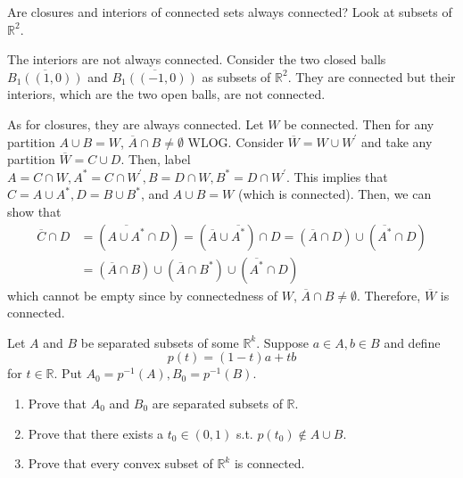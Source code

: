   \begin{exercise}[Rudin 2.20]
    Are closures and interiors of connected sets always connected? Look at subsets of $\mathbb{R}^2$. 
  \end{exercise}
  \begin{solution}
    The interiors are not always connected. Consider the two closed balls $\overline{B_1 ((1, 0))}$ and $\overline{B_1 ((-1, 0))}$ as subsets of $\mathbb{R}^2$. They are connected but their interiors, which are the two open balls, are not connected. 

    As for closures, they are always connected. Let $W$ be connected. Then for any partition $A \cup B = W$, $\overline{A} \cap B \neq \emptyset$ WLOG. Consider $\overline{W} = W \cup W^\prime$ and take any partition $\overline{W} = C \cup D$. Then, label $A = C \cap W, A^\ast = C \cap W^\prime, B = D \cap W, B^\ast = D \cap W^\prime$. This implies that $C = A \cup A^\ast, D = B \cup B^\ast$, and $A \cup B = W$ (which is connected). Then, we can show that 
    \begin{align*}
        \overline{C} \cap D & = (\overline{A \cup A^\ast} \cap D) = (\overline{A} \cup \overline{A^\ast}) \cap D = (\overline{A} \cap D) \cup (\overline{A^\ast} \cap D) \\
        & =(\overline{A} \cap B) \cup (\overline{A} \cap B^\ast) \cup (\overline{A^\ast} \cap D)
    \end{align*}
    which cannot be empty since by connectedness of $W$, $\overline{A} \cap B \neq \emptyset$. Therefore, $\overline{W}$ is connected. 
  \end{solution}

  \begin{exercise}[Rudin 2.21]
    Let $A$ and $B$ be separated subsets of some $\mathbb{R}^k$. Suppose $a \in A, b \in B$ and define 
    \begin{equation}
      p(t) = (1 - t) a + t b
    \end{equation}
    for $t \in \mathbb{R}$. Put $A_0 = p^{-1} (A), B_0 = p^{-1} (B)$. 
    \begin{enumerate}
        \item Prove that $A_0$ and $B_0$ are separated subsets of $\mathbb{R}$. 
        \item Prove that there exists a $t_0 \in (0, 1)$ s.t. $p(t_0) \not\in A \cup B$. 
        \item Prove that every convex subset of $\mathbb{R}^k$ is connected. 
    \end{enumerate}
  \end{exercise}
  \begin{solution}
    
  \end{solution}

